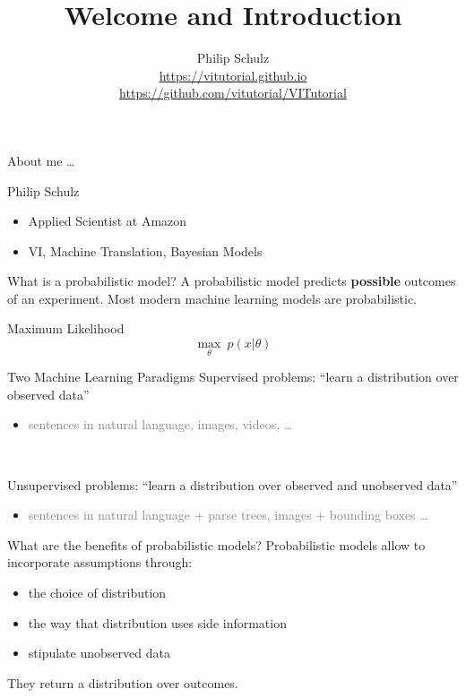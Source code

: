 \documentclass[14pt, aspectratio=169]{beamer}\usepackage[]{graphicx}\usepackage[]{color}
\title{Welcome and Introduction}
\date{}
\author{Philip Schulz \\
\url{https://vitutorial.github.io} \\
\url{https://github.com/vitutorial/VITutorial}}
\begin{document}
\frame{\titlepage}

\begin{frame}{About me \ldots}

\begin{block}{Philip Schulz}
\begin{itemize}
\item Applied Scientist at Amazon
\item VI, Machine Translation, Bayesian Models
\end{itemize}
\end{block}
\end{frame}

\begin{frame}{What is a probabilistic model?}
A probabilistic model predicts \textbf{possible} outcomes of an experiment.
Most modern machine learning models are probabilistic.
\pause
\begin{block}{Maximum Likelihood}
\begin{equation*}
\underset{\theta}{\max}~p(x|\theta)
\end{equation*}
\end{block}
\end{frame}

\begin{frame}{Two Machine Learning Paradigms}
Supervised problems: \alert{``learn a distribution over observed data''}
\begin{itemize}
	\item \textcolor{gray}{sentences in natural language, images, videos, \ldots}
\end{itemize}

~

Unsupervised problems: \alert{``learn a distribution over observed and unobserved data''}
\begin{itemize}
	\item \textcolor{gray}{sentences in natural language + parse trees, images + bounding boxes \ldots}
\end{itemize}


\end{frame}

\begin{frame}{What are the benefits of probabilistic models?}
Probabilistic models allow to incorporate assumptions through:
\begin{itemize}
\item the choice of distribution
\item the way that distribution uses side information
\item stipulate unobserved data
\end{itemize}
\pause
They return a distribution over outcomes.
\end{frame}
\end{document}
